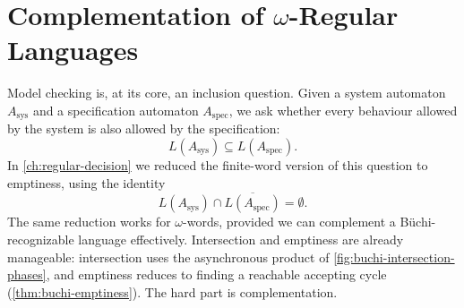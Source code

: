 
\chapter[Complementation of omega-Regular Languages]{Complementation of $\omega$-Regular Languages}
\label{ch:omega-complementation}


Model checking is, at its core, an inclusion question.  Given a system
automaton $A_{\mathrm{sys}}$ and a specification automaton
$A_{\mathrm{spec}}$, we ask whether every behaviour allowed by the system
is also allowed by the specification:
\[
  L(A_{\mathrm{sys}})\subseteq L(A_{\mathrm{spec}}).
\]
In \cref{ch:regular-decision} we reduced the finite-word version of this
question to emptiness, using the identity
\[
  L(A_{\mathrm{sys}})\cap \overline{L(A_{\mathrm{spec}})}=\emptyset.
\]
The same reduction works for $\omega$-words, provided we can complement
a B\"uchi-recognizable language effectively.  Intersection and emptiness
are already manageable: intersection uses the asynchronous product of
\cref{fig:buchi-intersection-phases}, and emptiness reduces to finding a
reachable accepting cycle (\cref{thm:buchi-emptiness}).  The hard part
is complementation.


